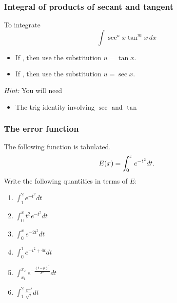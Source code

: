 \documentclass[14pt]{beamer}
\newcommand{\p}{\pause}
\newcommand{\setsize}[1]{\fontsize{#1}{#1}\selectfont} %
\newcommand{\smallerfont}{\setsize{13}} %
\newcommand{\vv}{\vspace{.2cm}}
\begin{document}
	\begin{frame}[t]
		\frametitle{Integral of products of secant and tangent}

		To integrate
		\[
			\int \sec^{n} x \tan^{m} x \, dx
		\]
		\begin{itemize}
			\item If \boxed{\phantom{spacespace}}, then use the substitution ${\displaystyle u = \tan x}$.

			\item If \boxed{\phantom{spacespace}}, then use the substitution ${\displaystyle u = \sec x}$.
		\end{itemize}

		\vfill

		{\smallerfont \emph{Hint:} You will need \begin{itemize}\begin{multicols}{2}\item ${\displaystyle \frac{d}{dx} \left[ \tan x \right] = \ldots}$ \item ${\displaystyle \frac{d}{dx} \left[ \sec x \right] = \ldots}$\end{multicols}

		\item The trig identity involving $\sec$ and $\tan$\end{itemize} }
	\end{frame}
	\begin{frame}[t]
		\frametitle{The error function}

		The following function is tabulated.
		\[
			{\Large E(x) = \int_0^x e^{-t^2} dt}.
		\]
		Write the following quantities in terms of $E$:

		\begin{multicols}{2}
			\begin{enumerate}
				\item ${\displaystyle \int_1^{2} e^{-t^2} dt}$

					\vv

				\item ${\displaystyle \int_0^x t^2 e^{-t^2} dt}$

					\vv

				\item ${\displaystyle \int_0^x e^{-2t^2} dt}$

					\vv \p

				\item ${\displaystyle \int_0^1 e^{-t^2+6t} dt}$

					\vv

				\item ${\displaystyle \int_{x_1}^{x_2} e^{-\frac{(t- \mu)^{2}}{\sigma^{2}}} dt}$

					\vv

				\item ${\displaystyle \int_1^2 \frac{e^{-t}}{\sqrt{t}} dt}$
			\end{enumerate}
		\end{multicols}
	\end{frame}
\end{document}
